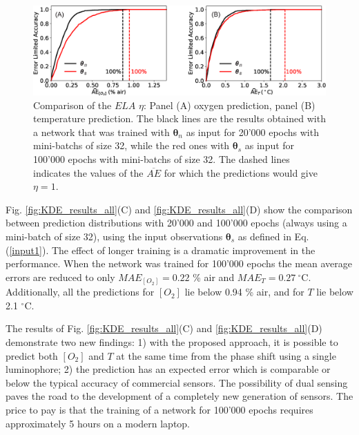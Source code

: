 \documentclass[sensors,article,submit,moreauthors,pdftex,10pt,a4paper]{Definitions/mdpi}
\begin{document}
\begin{figure}[t!]
\centering
\includegraphics[width=14 cm]{ELA_comparison_O2_T.eps}
\caption{Comparison of the $ELA$ $\eta$: Panel (A) oxygen prediction, panel (B) temperature prediction. The black lines are the results obtained with a network that was trained with ${\pmb \theta}_n$ as input for 20'000 epochs with mini-batchs of size 32, while the red ones with ${\pmb \theta}_s$ as input for 100'000 epochs with mini-batchs of size 32. The dashed lines indicates the values of the $\overline{AE}$ for which the predictions would give $\eta=1$.}
\label{fig:ELA_result_comparison}
\end{figure}

Fig. \ref{fig:KDE_results_all}(C) and \ref{fig:KDE_results_all}(D) show the comparison between prediction distributions with 20'000 and 100'000 epochs (always using a mini-batch of size 32), using the input observations ${\pmb \theta}_s$ as defined in Eq. (\ref{input1}). The effect of longer training is a dramatic improvement in the performance. When the network was trained for 100'000 epochs the mean average errors are reduced to only $MAE_{[O_2]}=0.22$ \% air and $MAE_{T}=0.27  \ ^\circ$C. Additionally, all the predictions for $[O_2]$ lie below 0.94 \% air, and for $T$ lie below 2.1 $^\circ$C.

The results of Fig. \ref{fig:KDE_results_all}(C) and \ref{fig:KDE_results_all}(D) demonstrate two new findings: 1) with the proposed approach, it is possible to predict both $[O_2]$ and $T$ at the same time from the phase shift using a single luminophore; 2) the prediction has an expected error which is comparable or below the typical accuracy of commercial sensors. The possibility of dual sensing paves the road to the development of a completely new generation of sensors.
The price to pay is that the training of a network for 100'000 epochs requires approximately 5 hours on a modern laptop.
\end{document}
